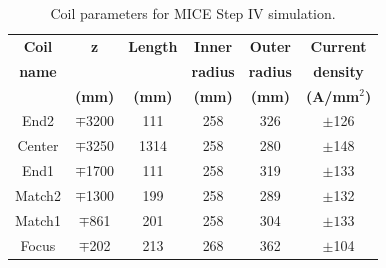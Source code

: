 \documentclass{jacow}
\begin{document}
\begin{table}[!ht]
\small
\begin{center}
\caption{Coil parameters for MICE Step IV simulation.}
\begin{tabular}{cccccc}
	\toprule
	\textbf{Coil} & \textbf{z} & \textbf{Length} & \textbf{Inner} & \textbf{Outer} & \textbf{Current}\\
	\textbf{name} & & & \textbf{radius} & \textbf{radius} & \textbf{density}\\
	 & \textbf{(mm)} & \textbf{(mm)} & \textbf{(mm)} & \textbf{(mm)} & \textbf{(A/mm$^2$)}\\
	\midrule
	End2 & $\mp$3200&111&258&326&$\pm$126 \\
	Center&$\mp$3250&1314&258&280&$\pm$148 \\
	End1 & $\mp$1700 & 111& 258 & 319 & $\pm$133 \\
	Match2 & $\mp$1300 & 199 & 258 & 289 & $\pm$132 \\
	Match1 & $\mp$861 & 201 & 258 & 304 & $\pm133$ \\
	Focus & $\mp$202 & 213 & 268 & 362 & $\pm$104 \\
	\bottomrule
\end{tabular}
\label{tbl:coil_parameters}
\end{center}
\end{table}
\end{document}
